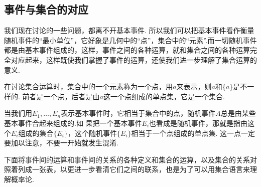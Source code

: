 \subsection{事件与集合的对应}
我们现在讨论的一些问题，都离不开基本事件. 所以我们可以把基本事件看作衡量随机事件的“最小单位”，它好象是几何中的“点”，集合中的“元素”.而一切随机事件都是由基本事件组成的，这样，事件之间的各种运算，就和集合之间的各种运算完全对应起来，这样既使我们掌握了事件的运算，还使我们进一步理解了集合运算的意义.

在讨论集合运算时，集合中的一个元素称为一个点，用$a$来表示，则$a$和$\{a\}$是不一样的. 前者是一个点，后者是由$a$这一个点组成的单点集，它是一个集合.

当我们用$E_1,\ldots,E_n$表示基本事件时，它相当于集合中的点，随机事件$A$总是由某些基本事件合起来组成的.如
果把一个基本事件$E_i$也看成是随机事件，那就是指由这个$E_i$组成的集合$\{E_i\}$，这个随机事件$\{E_i\}$相当于一个点组成的单点集. 这一点一定要加以注意，不要一开始就发生混淆.

下面将事件间的运算和事件间的关系的各种定义和集合的运算，以及集合的关系对照着列成一张表，以更进一步看清它们之间的联系，也是为了可以用集合语言来理解概率论.

